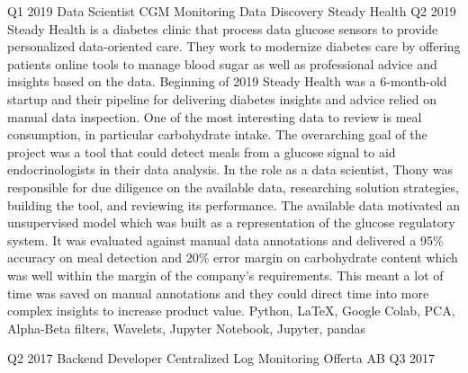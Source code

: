 \begin{experiences}
    \experience
    {Q1 2019}   
    {Data Scientist}
    {CGM Monitoring Data Discovery}
    {Steady Health}
    {Q2 2019} {
        Steady Health is a diabetes clinic that process data glucose sensors to provide personalized data-oriented care.
        They work to modernize diabetes care by offering patients online tools to manage blood sugar as well as professional advice and insights based on the data.
        \newline \newline
        Beginning of 2019 Steady Health was a 6-month-old startup and their pipeline for delivering diabetes insights and advice relied on manual data inspection.
        One of the most interesting data to review is meal consumption, in particular carbohydrate intake.
        The overarching goal of the project was a tool that could detect meals from a glucose signal to aid endocrinologists in their data analysis.
        \newline \newline
        In the role as a data scientist, Thony was responsible for due diligence on the available data, researching solution strategies, building the tool, and reviewing its performance.
        The available data motivated an unsupervised model which was built as a representation of the glucose regulatory system.
        It was evaluated against manual data annotations and delivered a 95\% accuracy on meal detection and 20\% error margin on carbohydrate content which was well within the margin of the company's requirements.
        This meant a lot of time was saved on manual annotations and they could direct time into more complex insights to increase product value.
        \newline
    }
    {Python, LaTeX, Google Colab, PCA, Alpha-Beta filters, Wavelets, Jupyter Notebook, Jupyter, pandas}  
    \emptySeparator
    
    \experience
    {Q2 2017}   
    {Backend Developer}
    {Centralized Log Monitoring}
    {Offerta AB}
    {Q3 2017} {

}
\end{experiences}
